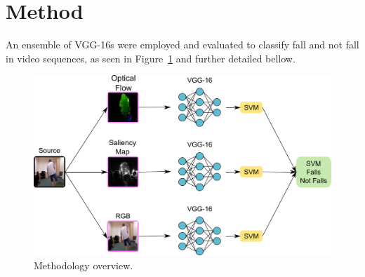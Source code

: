 \documentclass[conference]{IEEEtran}
\begin{document}



\section{Method}
\label{sec:method}

An ensemble of VGG-16s were employed and evaluated to classify fall and not fall in video sequences, as seen in Figure~\ref{fig:overview} and further detailed bellow.

\begin{figure}[htbp]
\centerline{\includegraphics[width=\linewidth]{figures/overview.png}}
\caption{Methodology overview.}
\label{fig:overview}
\end{figure}
\end{document}
